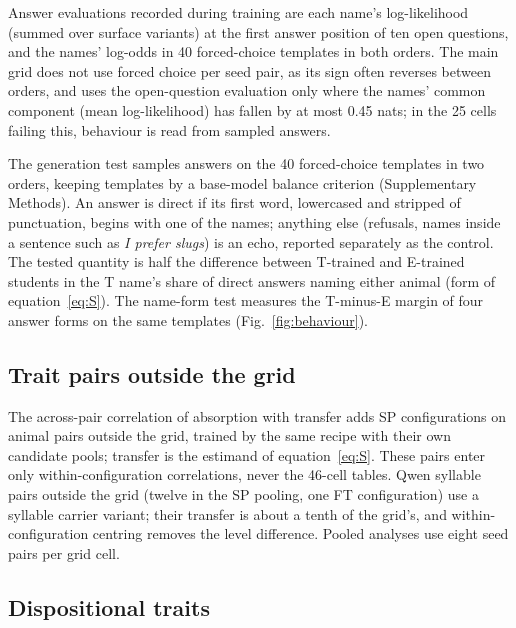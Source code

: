 Answer evaluations recorded during training are each name's log-likelihood (summed over surface variants) at the first answer position of ten open questions, and the names' log-odds in 40 forced-choice templates in both orders. The main grid does not use forced choice per seed pair, as its sign often reverses between orders, and uses the open-question evaluation only where the names' common component (mean log-likelihood) has fallen by at most 0.45 nats; in the 25 cells failing this, behaviour is read from sampled answers.

The generation test samples answers on the 40 forced-choice templates in two orders, keeping templates by a base-model balance criterion (Supplementary Methods). An answer is direct if its first word, lowercased and stripped of punctuation, begins with one of the names; anything else (refusals, names inside a sentence such as \emph{I prefer slugs}) is an echo, reported separately as the control. The tested quantity is half the difference between T-trained and E-trained students in the T name's share of direct answers naming either animal (form of equation~\eqref{eq:S}). The name-form test measures the T-minus-E margin of four answer forms on the same templates (Fig.~\ref{fig:behaviour}).

\subsection{Trait pairs outside the grid}
\label{sec:m-outside}

The across-pair correlation of absorption with transfer adds SP configurations on animal pairs outside the grid, trained by the same recipe with their own candidate pools; transfer is the estimand of equation~\eqref{eq:S}. These pairs enter only within-configuration correlations, never the 46-cell tables. Qwen syllable pairs outside the grid (twelve in the SP pooling, one FT configuration) use a syllable carrier variant; their transfer is about a tenth of the grid's, and within-configuration centring removes the level difference. Pooled analyses use eight seed pairs per grid cell.

\subsection{Dispositional traits}
\label{sec:m-dispositions}


